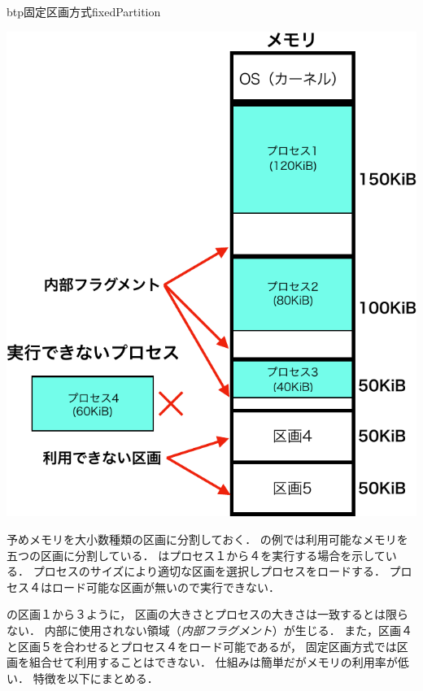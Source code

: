 \begin{myfig}{btp}{固定区画方式}{fixedPartition}
\begin{minipage}{0.49\columnwidth}
\begin{center}
      \label{fig:fixedPartitionA}
    \end{center}
  \end{minipage}
  \begin{minipage}{0.49\columnwidth}
    \begin{center}
      \includegraphics[scale=0.66]{Fig/fixedPartitionExec-crop.pdf}
      \label{fig:fixedPartitionB}
    \end{center}
  \end{minipage}
\end{myfig}

予めメモリを大小数種類の区画に分割しておく．
の例では利用可能なメモリを五つの区画に分割している．
はプロセス１から４を実行する場合を示している．
プロセスのサイズにより適切な区画を選択しプロセスをロードする．
プロセス４はロード可能な区画が無いので実行できない．

の区画１から３ように，
区画の大きさとプロセスの大きさは一致するとは限らない．
内部に使用されない領域（\emph{内部フラグメント}）が生じる．
また，区画４と区画５を合わせるとプロセス４をロード可能であるが，
固定区画方式では区画を組合せて利用することはできない．
仕組みは簡単だがメモリの利用率が低い．
特徴を以下にまとめる．

